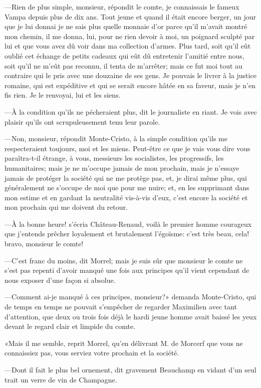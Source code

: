 —Rien de plus simple, monsieur, répondit le comte, je connaissais le fameux Vampa depuis plus de dix ans. Tout jeune et quand il était encore berger, un jour que je lui donnai je ne sais plus quelle monnaie d'or parce qu'il m'avait montré mon chemin, il me donna, lui, pour ne rien devoir à moi, un poignard sculpté par lui et que vous avez dû voir dans ma collection d'armes. Plus tard, soit qu'il eût oublié cet échange de petits cadeaux qui eût dû entretenir l'amitié entre nous, soit qu'il ne m'eût pas reconnu, il tenta de m'arrêter; mais ce fut moi tout au contraire qui le pris avec une douzaine de ses gens. Je pouvais le livrer à la justice romaine, qui est expéditive et qui se serait encore hâtée en sa faveur, mais je n'en fis rien. Je le renvoyai, lui et les siens. 

—À la condition qu'ils ne pécheraient plus, dit le journaliste en riant. Je vois avec plaisir qu'ils ont scrupuleusement tenu leur parole. 

—Non, monsieur, répondit Monte-Cristo, à la simple condition qu'ils me respecteraient toujours, moi et les miens. Peut-être ce que je vais vous dire vous paraîtra-t-il étrange, à vous, messieurs les socialistes, les progressifs, les humanitaires; mais je ne m'occupe jamais de mon prochain, mais je n'essaye jamais de protéger la société qui ne me protège pas, et, je dirai même plus, qui généralement ne s'occupe de moi que pour me nuire; et, en les supprimant dans mon estime et en gardant la neutralité vis-à-vis d'eux, c'est encore la société et mon prochain qui me doivent du retour. 

—À la bonne heure! s'écria Château-Renaud, voilà le premier homme courageux que j'entends prêcher loyalement et brutalement l'égoïsme: c'est très beau, cela! bravo, monsieur le comte! 

—C'est franc du moins, dit Morrel; mais je suis sûr que monsieur le comte ne s'est pas repenti d'avoir manqué une fois aux principes qu'il vient cependant de nous exposer d'une façon si absolue. 

—Comment ai-je manqué à ces principes, monsieur?» demanda Monte-Cristo, qui de temps en temps ne pouvait s'empêcher de regarder Maximilien avec tant d'attention, que deux ou trois fois déjà le hardi jeune homme avait baissé les yeux devant le regard clair et limpide du comte. 

«Mais il me semble, reprit Morrel, qu'en délivrant M. de Morcerf que vous ne connaissiez pas, vous serviez votre prochain et la société. 

—Dont il fait le plus bel ornement, dit gravement Beauchamp en vidant d'un seul trait un verre de vin de Champagne. 

